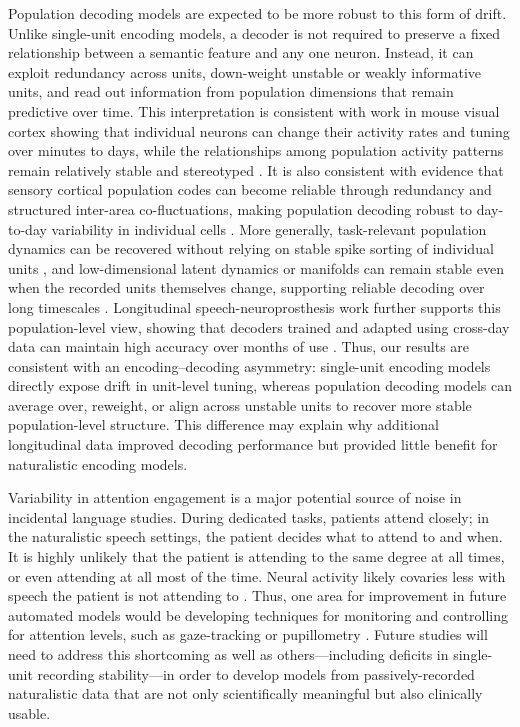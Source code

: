 \documentclass[pdflatex,sn-basic]{sn-jnl}%
\theoremstyle{thmstyleone}%
\theoremstyle{thmstyletwo}%
\theoremstyle{thmstylethree}%
\begin{document}
Population decoding models are expected to be more robust to this form of drift. Unlike single-unit encoding models, a decoder is not required to preserve a fixed relationship between a semantic feature and any one neuron. Instead, it can exploit redundancy across units, down-weight unstable or weakly informative units, and read out information from population dimensions that remain predictive over time. This interpretation is consistent with work in mouse visual cortex showing that individual neurons can change their activity rates and tuning over minutes to days, while the relationships among population activity patterns remain relatively stable and stereotyped \citep{bib142}. It is also consistent with evidence that sensory cortical population codes can become reliable through redundancy and structured inter-area co-fluctuations, making population decoding robust to day-to-day variability in individual cells \citep{bib143}. More generally, task-relevant population dynamics can be recovered without relying on stable spike sorting of individual units \citep{bib61}, and low-dimensional latent dynamics or manifolds can remain stable even when the recorded units themselves change, supporting reliable decoding over long timescales \citep{bib100,bib101}. Longitudinal speech-neuroprosthesis work further supports this population-level view, showing that decoders trained and adapted using cross-day data can maintain high accuracy over months of use \citep{bib102}. Thus, our results are consistent with an encoding--decoding asymmetry: single-unit encoding models directly expose drift in unit-level tuning, whereas population decoding models can average over, reweight, or align across unstable units to recover more stable population-level structure. This difference may explain why additional longitudinal data improved decoding performance but provided little benefit for naturalistic encoding models.

Variability in attention engagement is a major potential source of noise in incidental language studies. During dedicated tasks, patients attend closely; in the naturalistic speech settings, the patient decides what to attend to and when. It is highly unlikely that the patient is attending to the same degree at all times, or even attending at all most of the time. Neural activity likely covaries less with speech the patient is not attending to \citep{bib35,bib74,bib75}. Thus, one area for improvement in future automated models would be developing techniques for monitoring and controlling for attention levels, such as gaze-tracking or pupillometry \citep{bib121,bib122}. Future studies will need to address this shortcoming as well as others---including deficits in single-unit recording stability---in order to develop models from passively-recorded naturalistic data that are not only scientifically meaningful but also clinically usable.
\clearpage
\end{document}
